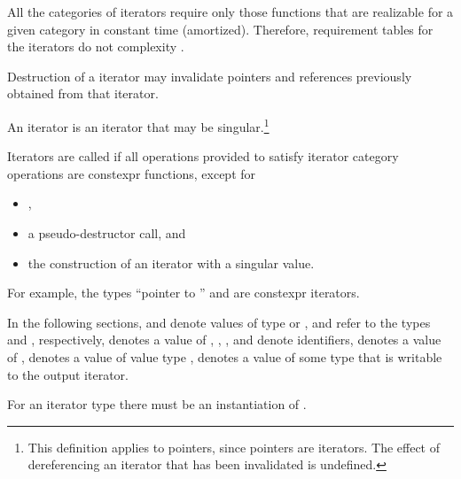 \pnum
All the categories of iterators require only those functions
that are realizable for a given category in constant time (amortized).
Therefore, requirement tables  for the iterators
do not   complexity .

\pnum
Destruction of a  iterator may invalidate
pointers and references previously obtained from that iterator.

\pnum
An
iterator is an iterator that may be singular.\footnote{This definition applies
to pointers, since pointers are iterators. The effect of dereferencing
an iterator that has been invalidated is undefined.}

\pnum
{}%
Iterators are called 
if all operations provided to satisfy iterator category operations
are constexpr functions, except for
\begin{itemize}
\item {},
\item a pseudo-destructor call, and
\item the construction of an iterator with a singular value.
\end{itemize}
\begin{note}
For example, the types ``pointer to '' and
 are constexpr iterators.
\end{note}

\begin{removedblock}
\pnum
In the following sections,
and
denote values of type
 or ,
 and  refer to the
types  and
, respectively,
denotes a value of
,
,
,
and
denote identifiers,
denotes a value of
,
denotes a value of value type
,
denotes a value of some type that is writable to the output iterator.
\begin{note} For an iterator type  there must be an instantiation
of . \end{note}
\end{removedblock}

